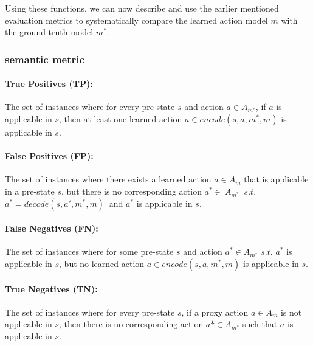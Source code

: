 Using these functions, we can now describe and use the earlier mentioned evaluation metrics to systematically compare the learned action model \( m \) with the ground truth model \( m^* \).

\subsubsection{semantic metric}
\paragraph{True Positives (TP):}
The set of instances where for every pre-state $s$ and action $a \in A_{m^*}$, if $a$ is applicable in $s$, then at least one learned action $a \in encode(s, a, m^*, m)$ is applicable in $s$.
\paragraph{False Positives (FP):}
The set of instances where there exists a learned action $a \in A_m$ that is applicable in a pre-state $s$, but there is no corresponding action $ a^* \in\ A_{m^*}\ $ $s.t.$ $a^*=decode(s,a',m^*,m) \ $ and $a^*$ is applicable in $s$.
\paragraph{False Negatives (FN):}
The set of instances where for some pre-state $s$ and action $a^* \in A_{m^*}$ $s.t.$ $a^*$ is applicable in $s$, but no learned action $a \in encode(s, a, m^*, m)$ is applicable in $s$.
\paragraph{True Negatives (TN):}
The set of instances where for every pre-state $s$, if a proxy action $a \in A_m$ is not applicable in $s$, then there is no corresponding action $a* \in A_{m^*}$ such that $a$ is applicable in $s$.

